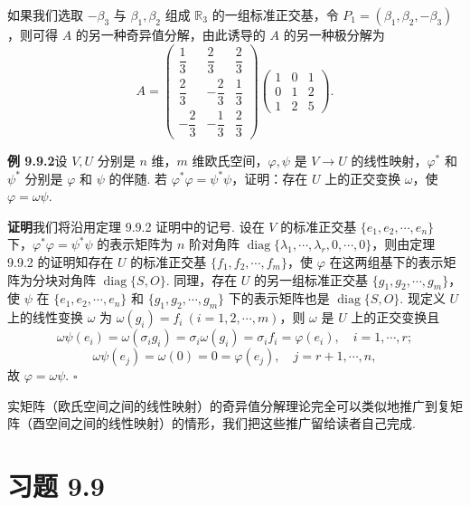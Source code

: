 \documentclass[UTF8, 12pt, fontset=fandol, oneside]{ctexart}
\begin{document}
如果我们选取 $-\beta_3$ 与 $\beta_1,\beta_2$ 组成 $\mathbb R_3$ 的一组标准正交基，令 $P_1=(\beta_1,\beta_2,-\beta_3)$，则可得 $A$ 的另一种奇异值分解，由此诱导的 $A$ 的另一种极分解为
\[
  A=
  \left(\begin{array}{ccc}
    \dfrac13 & \dfrac23 & \dfrac23\\
    \dfrac23 & -\dfrac23 & \dfrac13\\
    -\dfrac23 & -\dfrac13 & \dfrac23
  \end{array}\right)
  \left(\begin{array}{ccc}
    1 & 0 & 1\\
    0 & 1 & 2\\
    1 & 2 & 5
  \end{array}\right).
\]

\noindent\textbf{例 9.9.2}\quad 设 $V,U$ 分别是 $n$ 维，$m$ 维欧氏空间，$\varphi,\psi$ 是 $V\to U$ 的线性映射，$\varphi^*$ 和 $\psi^*$ 分别是 $\varphi$ 和 $\psi$ 的伴随. 若 $\varphi^*\varphi=\psi^*\psi$，证明：存在 $U$ 上的正交变换 $\omega$，使 $\varphi=\omega\psi$.

\noindent\textbf{证明}\quad 我们将沿用定理 9.9.2 证明中的记号. 设在 $V$ 的标准正交基 $\{e_1,e_2,\cdots,e_n\}$ 下，$\varphi^*\varphi=\psi^*\psi$ 的表示矩阵为 $n$ 阶对角阵 $\operatorname{diag}\{\lambda_1,\cdots,\lambda_r,0,\cdots,0\}$，则由定理 9.9.2 的证明知存在 $U$ 的标准正交基 $\{f_1,f_2,\cdots,f_m\}$，使 $\varphi$ 在这两组基下的表示矩阵为分块对角阵 $\operatorname{diag}\{S,O\}$. 同理，存在 $U$ 的另一组标准正交基 $\{g_1,g_2,\cdots,g_m\}$，使 $\psi$ 在 $\{e_1,e_2,\cdots,e_n\}$ 和 $\{g_1,g_2,\cdots,g_m\}$ 下的表示矩阵也是 $\operatorname{diag}\{S,O\}$. 现定义 $U$ 上的线性变换 $\omega$ 为 $\omega(g_i)=f_i\ (i=1,2,\cdots,m)$，则 $\omega$ 是 $U$ 上的正交变换且
\[
  \omega\psi(e_i)=\omega(\sigma_ig_i)=\sigma_i\omega(g_i)=\sigma_if_i=\varphi(e_i),\quad i=1,\cdots,r;
\]
\[
  \omega\psi(e_j)=\omega(0)=0=\varphi(e_j),\quad j=r+1,\cdots,n,
\]
故 $\varphi=\omega\psi$. $\square$

实矩阵（欧氏空间之间的线性映射）的奇异值分解理论完全可以类似地推广到复矩阵（酉空间之间的线性映射）的情形，我们把这些推广留给读者自己完成.

\section*{习题 9.9}
\end{document}
